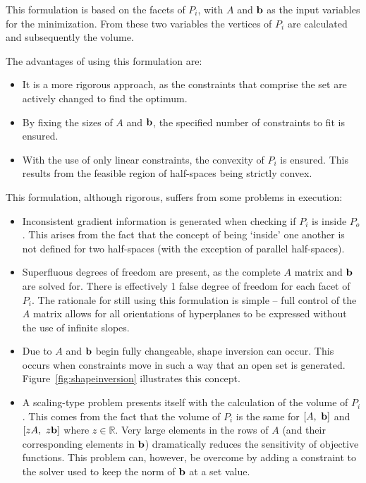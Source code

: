This formulation is based on the facets of $P_i$, with $A$ and ${\bf {b}}$ as the input variables for the minimization.
From these two variables the vertices of $P_i$ are calculated and subsequently the volume.

The advantages of using this formulation are:
\begin{itemize}
\item It is a more rigorous approach, as the constraints that comprise the set are actively changed to find the optimum.
\item By fixing the sizes of $A$ and ${\bf {b}}$, the specified number of constraints to fit is ensured.
\item With the use of only linear constraints, the convexity of $P_i$ is ensured.
This results from the feasible region of half-spaces being strictly convex.
\end{itemize}

This formulation, although rigorous, suffers from some problems in execution:
\begin{itemize}
\item Inconsistent gradient information is generated when checking if $P_i$ is inside $P_o$.
This arises from the fact that the concept of being `inside' one another is not defined for two half-spaces (with the exception of parallel half-spaces).
\item Superfluous degrees of freedom are present, as the complete $A$ matrix and ${\bf {b}}$ are solved for.
There is effectively 1 false degree of freedom for each facet of $P_i$.
The rationale for still using this formulation is simple -- full control of the $A$ matrix allows for all orientations of hyperplanes to be expressed without the use of infinite slopes.
\item Due to $A$ and ${\bf {b}}$ begin fully changeable, shape inversion can occur.
This occurs when constraints move in such a way that an open set is generated.
Figure~\ref{fig:shapeinversion} illustrates this concept.
\item A scaling-type problem presents itself with the calculation of the volume of $P_i$.
This comes from the fact that the volume of $P_i$ is the same for $[A,~ {\bf {b}}]$ and $[zA,~z{\bf {b}}]$ where $z\in \mathbb{R}$.
Very large elements in the rows of $A$ (and their corresponding elements in ${\bf {b}}$) dramatically reduces the sensitivity of objective functions.
This problem can, however, be overcome by adding a constraint to the solver used to keep the norm of ${\bf {b}}$ at a set value.
\end{itemize}

